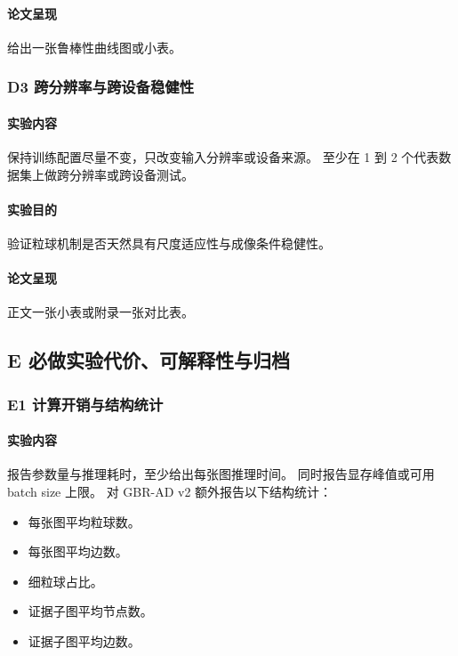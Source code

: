 \documentclass[UTF8,a4paper]{ctexart}
\begin{document}
\paragraph{论文呈现}
给出一张鲁棒性曲线图或小表。

\subsubsection{D3 跨分辨率与跨设备稳健性}

\paragraph{实验内容}
保持训练配置尽量不变，只改变输入分辨率或设备来源。
至少在 1 到 2 个代表数据集上做跨分辨率或跨设备测试。

\paragraph{实验目的}
验证粒球机制是否天然具有尺度适应性与成像条件稳健性。

\paragraph{论文呈现}
正文一张小表或附录一张对比表。

\subsection{E 必做实验\quad 代价、可解释性与归档}

\subsubsection{E1 计算开销与结构统计}

\paragraph{实验内容}
报告参数量与推理耗时，至少给出每张图推理时间。
同时报告显存峰值或可用 batch size 上限。
对 GBR-AD v2 额外报告以下结构统计：
\begin{itemize}
  \item 每张图平均粒球数。
  \item 每张图平均边数。
  \item 细粒球占比。
  \item 证据子图平均节点数。
  \item 证据子图平均边数。
\end{itemize}
\end{document}
